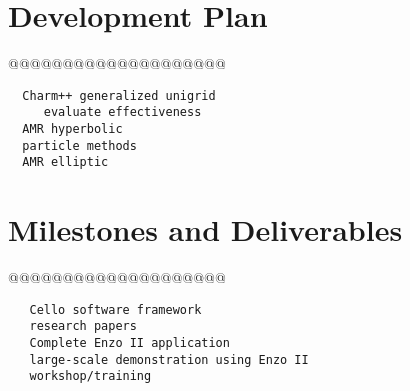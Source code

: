 \documentclass{article}
\begin{document}
\section{Development Plan} \label{s:plan} 

@@@@@@@@@@@@@@@@@@@@

\begin{verbatim}
  Charm++ generalized unigrid
     evaluate effectiveness
  AMR hyperbolic
  particle methods
  AMR elliptic
\end{verbatim}

\section{Milestones and Deliverables} \label{s:milestones}

@@@@@@@@@@@@@@@@@@@@

\begin{verbatim}
   Cello software framework
   research papers
   Complete Enzo II application
   large-scale demonstration using Enzo II
   workshop/training
\end{verbatim}



\end{document}
